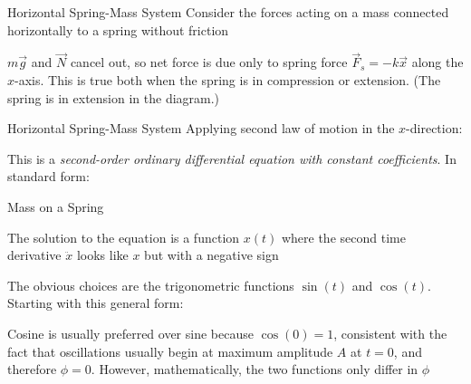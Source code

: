 \documentclass[12pt,compress,aspectratio=169]{beamer}
\begin{document}
\begin{frame}{Horizontal Spring-Mass System}
  Consider the forces acting on a mass connected horizontally to a spring
  without friction
  \begin{center}
  \end{center}
  $m\vec g$ and $\vec N$ cancel out, so net force is due only to spring force
  $\vec F_s=-k\vec x$ along the $x$-axis. This is true both when the spring is
  in compression or extension. (The spring is in extension in the diagram.)
\end{frame}



\begin{frame}{Horizontal Spring-Mass System}
  Applying second law of motion in the $x$-direction:


  This is a
  \emph{second-order ordinary differential equation with constant
    coefficients}. In standard form:

  

\end{frame}



\begin{frame}{Mass on a Spring}

  The solution to the equation is a function $x(t)$ where the second time
  derivative $\ddot x$ looks like $x$ but with a negative sign


  The obvious choices are the trigonometric functions $\sin(t)$ and $\cos(t)$.
  Starting with this general form:
    
  
  \vspace{-.1in}Cosine is usually preferred over sine because $\cos(0)=1$,
  consistent with the fact that oscillations usually begin at maximum amplitude
  $A$ at $t=0$, and therefore $\phi=0$. However, mathematically, the two
  functions only differ in $\phi$
\end{frame}
\end{document}
